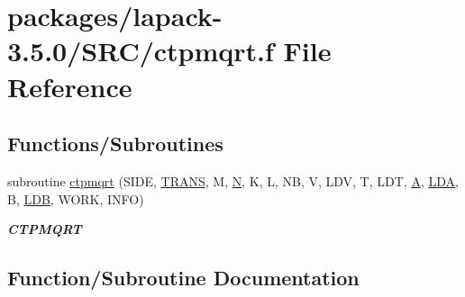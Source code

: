 \hypertarget{ctpmqrt_8f}{}\section{packages/lapack-\/3.5.0/\+S\+R\+C/ctpmqrt.f File Reference}
\label{ctpmqrt_8f}
\subsection*{Functions/\+Subroutines}
\begin{DoxyCompactItemize}
\item 
subroutine \hyperlink{ctpmqrt_8f_a58cb7c7edbdba588e8f1f45a6841d025}{ctpmqrt} (S\+I\+D\+E, \hyperlink{superlu__enum__consts_8h_a0c4e17b2d5cea33f9991ccc6a6678d62a1f61e3015bfe0f0c2c3fda4c5a0cdf58}{T\+R\+A\+N\+S}, M, \hyperlink{polmisc_8c_a0240ac851181b84ac374872dc5434ee4}{N}, K, L, N\+B, V, L\+D\+V, T, L\+D\+T, \hyperlink{classA}{A}, \hyperlink{example__user_8c_ae946da542ce0db94dced19b2ecefd1aa}{L\+D\+A}, B, \hyperlink{example__user_8c_a50e90a7104df172b5a89a06c47fcca04}{L\+D\+B}, W\+O\+R\+K, I\+N\+F\+O)
\begin{DoxyCompactList}\small\item\em {\bfseries C\+T\+P\+M\+Q\+R\+T} \end{DoxyCompactList}\end{DoxyCompactItemize}


\subsection{Function/\+Subroutine Documentation}
\hypertarget{ctpmqrt_8f_a58cb7c7edbdba588e8f1f45a6841d025}{}
